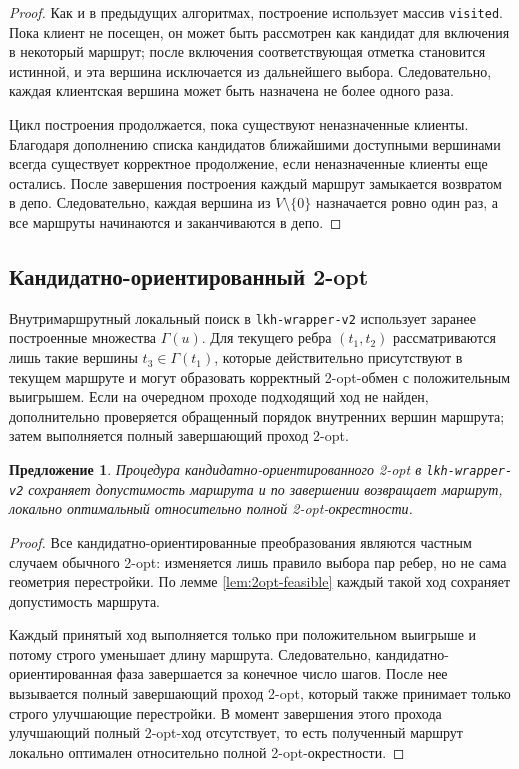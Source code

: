 \documentclass[a4paper,12pt]{article}
\newtheorem{proposition}{Предложение}[section]
\newcommand{\clients}{V \setminus \{0\}}
\begin{document}
\begin{proof}
Как и в предыдущих алгоритмах, построение использует массив \texttt{visited}. Пока клиент не
посещен, он может быть рассмотрен как кандидат для включения в некоторый маршрут; после
включения соответствующая отметка становится истинной, и эта вершина исключается из
дальнейшего выбора. Следовательно, каждая клиентская вершина может быть назначена не более
одного раза.

Цикл построения продолжается, пока существуют неназначенные клиенты. Благодаря дополнению
списка кандидатов ближайшими доступными вершинами всегда существует корректное продолжение,
если неназначенные клиенты еще остались. После завершения построения каждый маршрут
замыкается возвратом в депо. Следовательно, каждая вершина из \(\clients\) назначается
ровно один раз, а все маршруты начинаются и заканчиваются в депо.
\end{proof}

\subsection{Кандидатно-ориентированный 2-opt}

Внутримаршрутный локальный поиск в \texttt{lkh-wrapper-v2} использует заранее построенные
множества \(\Gamma(u)\). Для текущего ребра \((t_1,t_2)\) рассматриваются лишь такие вершины
\(t_3 \in \Gamma(t_1)\), которые действительно присутствуют в текущем маршруте и могут
образовать корректный 2-opt-обмен с положительным выигрышем. Если на очередном проходе
подходящий ход не найден, дополнительно проверяется обращенный порядок внутренних вершин
маршрута; затем выполняется полный завершающий проход 2-opt.

\begin{proposition}
Процедура кандидатно-ориентированного 2-opt в \texttt{lkh-wrapper-v2} сохраняет допустимость маршрута и
по завершении возвращает маршрут, локально оптимальный относительно полной 2-opt-окрестности.
\end{proposition}

\begin{proof}
Все кандидатно-ориентированные преобразования являются частным случаем обычного 2-opt: изменяется лишь
правило выбора пар ребер, но не сама геометрия перестройки. По лемме
\ref{lem:2opt-feasible} каждый такой ход сохраняет допустимость маршрута.

Каждый принятый ход выполняется только при положительном выигрыше и потому строго уменьшает
длину маршрута. Следовательно, кандидатно-ориентированная фаза завершается за конечное число шагов.
После нее вызывается полный завершающий проход 2-opt, который также принимает только строго
улучшающие перестройки. В момент завершения этого прохода улучшающий полный 2-opt-ход
отсутствует, то есть полученный маршрут локально оптимален относительно полной
2-opt-окрестности.
\end{proof}
\end{document}
